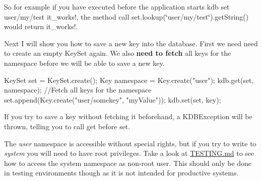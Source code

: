 So for example if you have executed before the application starts {\ttfamily kdb set user/my/test it\+\_\+works!}, the method call {\ttfamily set.\+lookup(\char`\"{}user/my/test\char`\"{}).get\+String()} would return {\ttfamily it\+\_\+works!}.

Next I will show you how to save a new key into the database. First we need need to create an empty {\ttfamily Key\+Set} again. We also {\bfseries need to fetch} all keys for the namespace before we will be able to save a new key.


\begin{DoxyCode}
KeySet \textcolor{keyword}{set} = KeySet.create();
Key \textcolor{keyword}{namespace }= Key.create("user");
kdb.get(\textcolor{keyword}{set}, \textcolor{keyword}{namespace});    \textcolor{comment}{//Fetch all keys for the namespace}
\textcolor{keyword}{set}.append(Key.create(\textcolor{stringliteral}{"user/somekey"}, \textcolor{stringliteral}{"myValue"}));
kdb.set(\textcolor{keyword}{set}, key);
\end{DoxyCode}


If you try to save a key without fetching it beforehand, a {\ttfamily K\+D\+B\+Exception} will be thrown, telling you to call get before set.

The {\itshape user} namespace is accessible without special rights, but if you try to write to {\itshape system} you will need to have root privileges. Take a look at \hyperlink{doc_TESTING_md}{T\+E\+S\+T\+I\+NG.md} to see how to access the system namespace as non-\/root user. This should only be done in testing environments though as it is not intended for productive systems.




